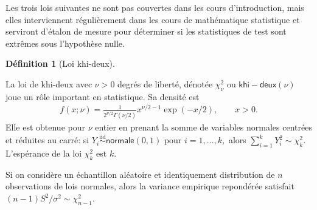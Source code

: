 \documentclass[
  11pt,
  letterpaper,
]{scrbook}
\theoremstyle{plain}
\theoremstyle{plain}
\theoremstyle{definition}
\theoremstyle{definition}
\newtheorem{definition}{Définition}[chapter]
\theoremstyle{remark}
\begin{document}
Les trois lois suivantes ne sont pas couvertes dans les cours
d'introduction, mais elles interviennent régulièrement dans les cours de
mathématique statistique et serviront d'étalon de mesure pour déterminer
si les statistiques de test sont extrêmes sous l'hypothèse nulle.

\begin{definition}[Loi
khi-deux]\protect\hypertarget{def-loikhideux}{}\label{def-loikhideux}

La loi de khi-deux avec \(\nu>0\) degrés de liberté, dénotée
\(\chi^2_{\nu}\) ou \(\mathsf{khi-deux}(\nu)\) joue un rôle important en
statistique. Sa densité est \begin{align*}
f(x; \nu) = \frac{1}{2^{\nu/2}\Gamma(\nu/2)}x^{\nu/2-1}\exp(-x/2),\qquad x >0.
\end{align*} Elle est obtenue pour \(\nu\) entier en prenant la somme de
variables normales centrées et réduites au carré: si
\(Y_i \stackrel{\mathrm{iid}}{\sim}\mathsf{normale}(0,1)\) pour
\(i=1, \ldots, k,\) alors \(\sum_{i=1}^k Y_i^2 \sim \chi^2_k.\)
L'espérance de la loi \(\chi^2_k\) est \(k.\)

\end{definition}

Si on considère un échantillon aléatoire et identiquement distribution
de \(n\) observations de lois normales, alors la variance empirique
repondérée satisfait \((n-1)S^2/\sigma^2 \sim \chi^2_{n-1}.\)
\end{document}
